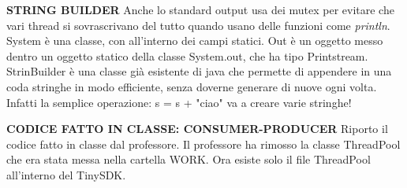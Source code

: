 \noindent \textbf{STRING BUILDER} \newline
Anche lo standard output usa dei mutex per evitare che vari thread si sovrascrivano del tutto quando usano delle funzioni come \textit{println}. \newline
System è una classe, con all'interno dei campi statici. Out è un oggetto messo dentro un oggetto statico della classe System.out, che ha tipo Printstream. \newline
StrinBuilder è una classe già esistente di java che permette di appendere in una coda stringhe in modo efficiente, senza doverne generare di nuove ogni volta. Infatti la semplice operazione: s = s + "ciao" va a creare varie stringhe! 


\noindent \textbf{CODICE FATTO IN CLASSE: CONSUMER-PRODUCER} \newline
Riporto il codice fatto in classe dal professore. \newline
Il professore ha rimosso la classe ThreadPool che era stata messa nella cartella WORK. Ora esiste solo il file ThreadPool all'interno del TinySDK. \newline



